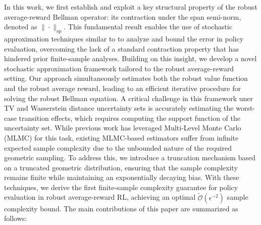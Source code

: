 In this work, we first establish and exploit a key structural property of the robust average-reward Bellman operator: its contraction under the span semi-norm, denoted as $\|\cdot\|_{\mathrm{sp}}$. This fundamental result enables the use of stochastic approximation techniques similar to \citep{zhang2021finite} to analyze and bound the error in policy evaluation, overcoming the lack of a standard contraction property that has hindered prior finite-sample analyses. Building on this insight, we develop a novel stochastic approximation framework tailored to the robust average-reward setting. Our approach simultaneously estimates both the robust value function and the robust average reward, leading to an efficient iterative procedure for solving the robust Bellman equation. A critical challenge in this framework uner TV and Wasserstein distance uncertainty sets is accurately estimating the worst-case transition effects, which requires computing the support function of the uncertainty set. While previous work has leveraged Multi-Level Monte Carlo (MLMC) for this task, existing MLMC-based estimators suffer from infinite expected sample complexity due to the unbounded nature of the required geometric sampling. To address this, we introduce a truncation mechanism based on a truncated geometric distribution, ensuring that the sample complexity remains finite while maintaining an exponentially decaying bias. With these techniques, we derive the first finite-sample complexity guarantee for policy evaluation in robust average-reward RL, achieving an optimal $\tilde{\mathcal{O}}(\epsilon^{-2})$ sample complexity bound. The main contributions of this paper are summarized as
follows:

